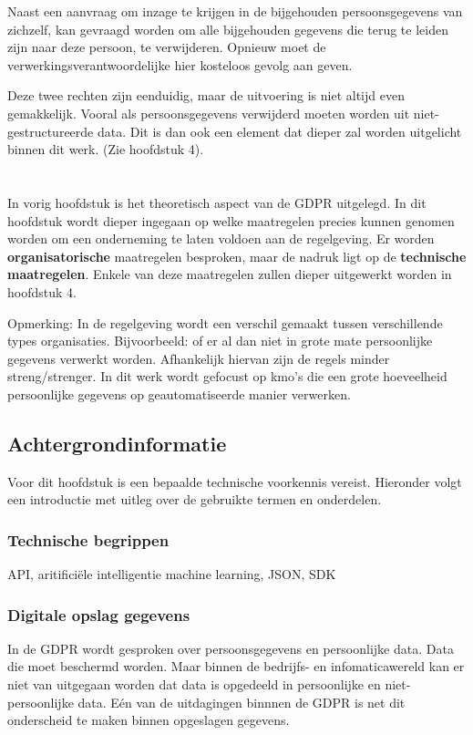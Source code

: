 Naast een aanvraag om inzage te krijgen in de bijgehouden persoonsgegevens van zichzelf, kan gevraagd worden om alle bijgehouden gegevens die terug te leiden zijn naar deze persoon, te verwijderen. Opnieuw moet de verwerkingsverantwoordelijke hier kosteloos gevolg aan geven. 

Deze twee rechten zijn eenduidig, maar de uitvoering is niet altijd even gemakkelijk. Vooral als persoonsgegevens verwijderd moeten worden uit niet-gestructureerde data. Dit is dan ook een element dat dieper zal worden uitgelicht binnen dit werk. (Zie hoofdstuk 4). 


\chapter{}
\label{ch:Maatregelen}
In vorig hoofdstuk is het theoretisch aspect van de GDPR uitgelegd. In dit hoofdstuk wordt dieper ingegaan op welke maatregelen precies kunnen genomen worden om een onderneming te laten voldoen aan de regelgeving. Er worden \textbf{organisatorische} maatregelen besproken, maar de nadruk ligt op de \textbf{technische maatregelen}. Enkele van deze maatregelen zullen dieper uitgewerkt worden in hoofdstuk 4. 

Opmerking: In de regelgeving wordt een verschil gemaakt tussen verschillende types organisaties. Bijvoorbeeld: of er al dan niet in grote mate persoonlijke gegevens verwerkt worden. Afhankelijk hiervan zijn de regels minder streng/strenger. In dit werk wordt gefocust op kmo's die een grote hoeveelheid persoonlijke gegevens op geautomatiseerde manier verwerken. 

\section{Achtergrondinformatie}
Voor dit hoofdstuk is een bepaalde technische voorkennis vereist. Hieronder volgt een introductie met uitleg over de gebruikte termen en onderdelen. 

\subsection{Technische begrippen}
API, 
aritificiële intelligentie 
  machine learning, JSON, SDK

\subsection{Digitale opslag gegevens}
In de GDPR wordt gesproken over persoonsgegevens en persoonlijke data. Data die moet beschermd worden. Maar binnen de bedrijfs- en infomaticawereld kan er niet van uitgegaan worden dat data is opgedeeld in persoonlijke en niet-persoonlijke data. Eén van de uitdagingen binnnen de GDPR is net dit onderscheid te maken binnen opgeslagen gegevens. \\

